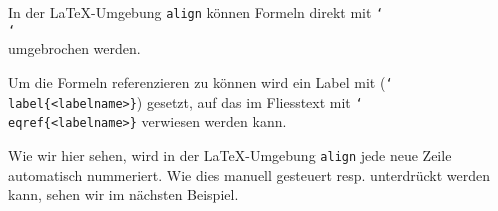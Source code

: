 
In der \LaTeX-Umgebung \texttt{align} können Formeln direkt mit \texttt{\char`\\}\texttt{\char`\\} umgebrochen werden.

Um die Formeln referenzieren zu können wird ein Label mit (\texttt{\char`\\label\{<labelname>\}}) gesetzt, auf das im Fliesstext mit \texttt{\char`\\eqref\{<labelname>\}} verwiesen werden kann.

Wie wir hier sehen, wird in der \LaTeX-Umgebung \texttt{align} jede neue Zeile automatisch nummeriert. Wie dies manuell gesteuert resp. unterdrückt werden kann, sehen wir im nächsten Beispiel.
